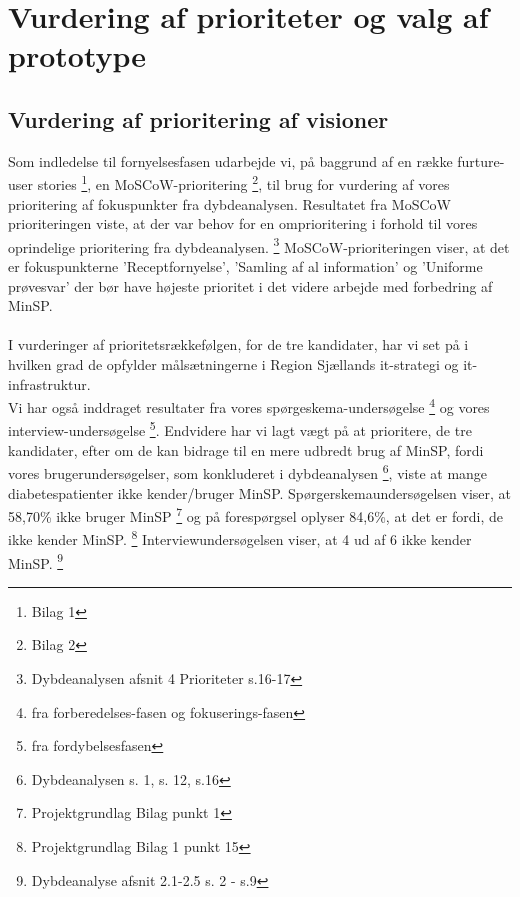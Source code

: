 %
% 
%
\section{Vurdering af prioriteter og valg af prototype}
\subsection{Vurdering af prioritering af visioner}
Som indledelse til fornyelsesfasen udarbejde vi, på baggrund af en række furture-user stories \footnote{Bilag 1}, en MoSCoW-prioritering \footnote{Bilag 2}, til brug for vurdering af vores prioritering af fokuspunkter fra dybdeanalysen.
Resultatet fra MoSCoW prioriteringen viste, at der var behov for en omprioritering i forhold til vores oprindelige prioritering fra dybdeanalysen. \footnote{Dybdeanalysen afsnit 4 Prioriteter s.16-17}
%
MoSCoW-prioriteringen viser, at det er fokuspunkterne 'Receptfornyelse', 'Samling af al information' og 'Uniforme prøvesvar' der bør have højeste prioritet i det videre arbejde med forbedring af MinSP.\\
\\
I vurderinger af prioritetsrækkefølgen, for de tre kandidater, har vi set på i hvilken grad de opfylder målsætningerne i Region Sjællands it-strategi og it-infrastruktur. \\
Vi har også inddraget resultater fra vores spørgeskema-undersøgelse \footnote{fra forberedelses-fasen og fokuserings-fasen} og vores interview-undersøgelse \footnote{fra fordybelsesfasen}.
Endvidere har vi lagt vægt på at prioritere, de tre kandidater, efter om de kan bidrage til en mere udbredt brug af MinSP, fordi vores brugerundersøgelser, som konkluderet i dybdeanalysen \footnote{Dybdeanalysen s. 1, s. 12, s.16}, viste at mange diabetespatienter ikke kender/bruger MinSP. 
Spørgerskemaundersøgelsen viser, at 58,70\% ikke bruger MinSP \footnote{Projektgrundlag Bilag punkt 1} og på forespørgsel oplyser 84,6\%, at det er fordi, de ikke kender MinSP. \footnote{Projektgrundlag Bilag 1 punkt 15} Interviewundersøgelsen viser, at 4 ud af 6 ikke kender MinSP. \footnote{Dybdeanalyse afsnit 2.1-2.5 s. 2 - s.9}\\
